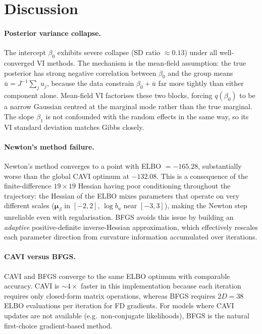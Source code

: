 \documentclass[11pt,a4paper]{article}
\begin{document}
\section{Discussion}

\paragraph{Posterior variance collapse.}
The intercept $\beta_0$ exhibits severe collapse (SD ratio $\approx 0.13$) under all
well-converged VI methods.
The mechanism is the mean-field assumption: the true posterior has strong negative
correlation between $\beta_0$ and the group means $\bar{u} = J^{-1}\sum_j u_j$,
because the data constrain $\beta_0 + \bar{u}$ far more tightly than either component
alone.
Mean-field VI factorises these two blocks, forcing $q(\beta_0)$ to be a narrow Gaussian
centred at the marginal mode rather than the true marginal.
The slope $\beta_1$ is not confounded with the random effects in the same way, so its
VI standard deviation matches Gibbs closely.

\paragraph{Newton's method failure.}
Newton's method converges to a point with ELBO $= -165.28$, substantially worse than
the global CAVI optimum at $-132.08$.
This is a consequence of the finite-difference $19\times19$ Hessian having poor
conditioning throughout the trajectory: the Hessian of the ELBO mixes parameters
that operate on very different scales ($\bm{\mu}_\beta$ in $[-2,2]$, $\log b_u$ near
$[-3, 3]$), making the Newton step unreliable even with regularisation.
BFGS avoids this issue by building an \emph{adaptive} positive-definite inverse-Hessian
approximation, which effectively rescales each parameter direction from curvature
information accumulated over iterations.

\paragraph{CAVI versus BFGS.}
CAVI and BFGS converge to the same ELBO optimum with comparable accuracy.
CAVI is $\sim 4\times$ faster in this implementation because each iteration requires
only closed-form matrix operations, whereas BFGS requires $2D = 38$ ELBO evaluations
per iteration for FD gradients.
For models where CAVI updates are not available (e.g.\ non-conjugate likelihoods),
BFGS is the natural first-choice gradient-based method.
\end{document}
